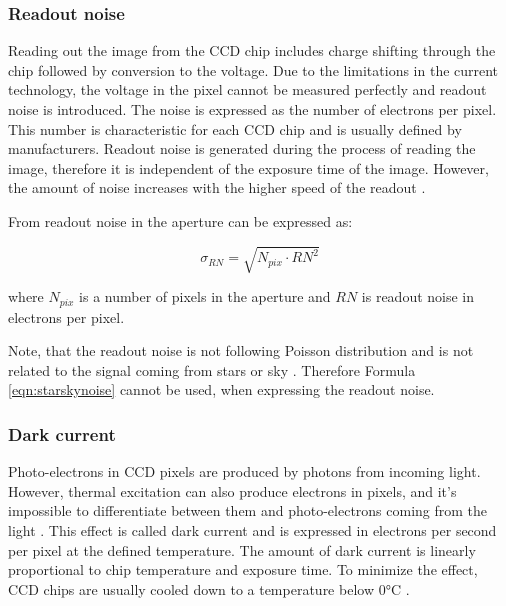     \subsubsection{Readout noise}
    
    Reading out the image from the CCD chip includes charge shifting through the chip followed by conversion to the voltage. Due to the limitations in the current technology, the voltage in the pixel cannot be measured perfectly and readout noise is introduced. 
    The noise is expressed as the number of electrons per pixel. This number is characteristic for each CCD chip and is usually defined by manufacturers.
    Readout noise is generated during the process of reading the image, therefore it is independent of the exposure time of the image. However, the amount of noise increases with the higher speed of the readout \cite{articleCcdOnline}.
    
    From \cite{bolte15} readout noise in the aperture can be expressed as: 
    
    \begin{equation}
    \label{eqn:readoutNoise}
         \sigma_{RN} = \sqrt{N_{pix} \cdot {RN}^2 }
    \end{equation}
    
    where $N_{pix}$ is a number of pixels in the aperture and $RN$ is readout noise in electrons per pixel.

    Note, that the readout noise is not following Poisson distribution and is not related to the signal coming from stars or sky \cite{matfyzpress01}. Therefore Formula \ref{eqn:starskynoise} cannot be used, when expressing the readout noise. 

    \subsubsection{Dark current}
    
    Photo-electrons in CCD pixels are produced by photons from incoming light. However, thermal excitation can also produce electrons in pixels, and it's impossible to differentiate between them and photo-electrons coming from the light \cite{phy217}.
    This effect is called dark current and is expressed in electrons per second per pixel at the defined temperature. The amount of dark current is linearly proportional to chip temperature and exposure time. To minimize the effect, CCD chips are usually cooled down to a temperature below 0°C \cite{articleCcdOnline}.
    
